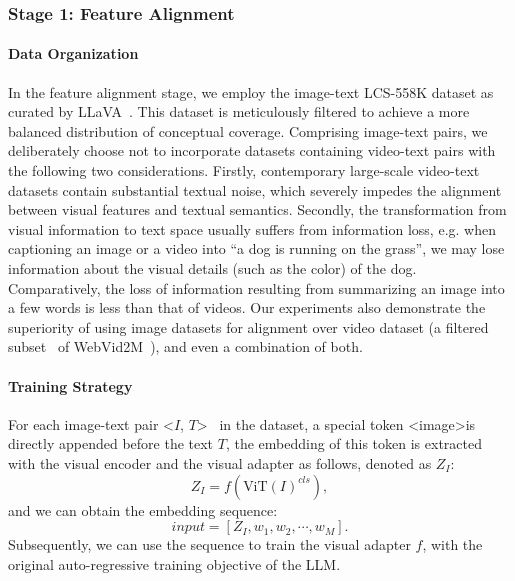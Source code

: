 \documentclass[10pt,twocolumn,letterpaper]{article}
\begin{document}
\subsubsection{Stage 1: Feature Alignment}

\paragraph{Data Organization} In the feature alignment stage, we employ the image-text LCS-558K dataset as curated by LLaVA~\cite{liu2023llava}. This dataset is meticulously filtered to achieve a more balanced distribution of conceptual coverage. Comprising image-text pairs, we deliberately choose not to incorporate datasets containing video-text pairs with the following two considerations. Firstly, contemporary large-scale video-text datasets contain substantial textual noise, which severely impedes the alignment between visual features and textual semantics. Secondly, the transformation from visual information to text space usually suffers from information loss, e.g. when captioning an image or a video into ``a dog is running on the grass'', we may lose information about the visual details (such as the color) of the dog. Comparatively, the loss of information resulting from summarizing an image into a few words is less than that of videos. Our experiments also demonstrate the superiority of using image datasets for alignment over video dataset (a filtered subset~\cite{luo2023valley} of WebVid2M~\cite{bain2021webvid}), and even a combination of both.

\paragraph{Training Strategy} For each image-text pair \textless $I$, $T$\textgreater~ in the dataset, a special token \textless image\textgreater is directly appended before the text $T$, the embedding of this token is extracted with the visual encoder and the visual adapter as follows, denoted as $Z_I$:
\begin{equation}
    Z_I = f(\text{ViT}(I)^{cls}),
\end{equation}
and we can obtain the embedding sequence:
\begin{equation}
    input = [Z_I, w_1, w_2, \cdots, w_M].
\end{equation}
Subsequently, we can use the sequence to train the visual adapter $f$, with the original auto-regressive training objective of the LLM.
\end{document}
